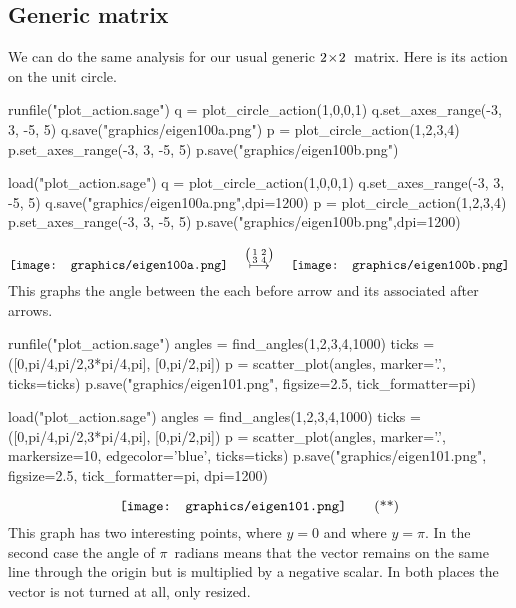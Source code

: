 \subsection{Generic matrix}
We can do the same analysis for our usual generic $2 \! \times \! 2$~matrix.
Here is its action on the unit circle.
\begin{sageoutput}[d,0,4;d,5,7]
runfile("plot_action.sage")
q = plot_circle_action(1,0,0,1) 
q.set_axes_range(-3, 3, -5, 5) 
q.save("graphics/eigen100a.png")
p = plot_circle_action(1,2,3,4) 
p.set_axes_range(-3, 3, -5, 5) 
p.save("graphics/eigen100b.png")
\end{sageoutput}
\begin{sagesilent}
load("plot_action.sage")
q = plot_circle_action(1,0,0,1) 
q.set_axes_range(-3, 3, -5, 5) 
q.save("graphics/eigen100a.png",dpi=1200)
p = plot_circle_action(1,2,3,4) 
p.set_axes_range(-3, 3, -5, 5) 
p.save("graphics/eigen100b.png",dpi=1200)
\end{sagesilent}
\begin{equation*}
  \vcenteredhbox{\texttt{[image: graphics/eigen100a.png]}}
  \quad\mapsunder{\big (\begin{smallmatrix} 1 &2 \\ 3 &4 \end{smallmatrix}\big )}\quad
  \vcenteredhbox{\texttt{[image: graphics/eigen100b.png]}}
\end{equation*}
This graphs the angle between the each before arrow and its associated after
arrows.
\begin{sageoutput}[d,0,1]
runfile("plot_action.sage")  
angles = find_angles(1,2,3,4,1000)
ticks = ([0,pi/4,pi/2,3*pi/4,pi], [0,pi/2,pi])
p = scatter_plot(angles, marker='.', ticks=ticks)
p.save("graphics/eigen101.png", figsize=2.5, tick_formatter=pi)
\end{sageoutput}
\begin{sagesilent}
load("plot_action.sage")  
angles = find_angles(1,2,3,4,1000)
ticks = ([0,pi/4,pi/2,3*pi/4,pi], [0,pi/2,pi])
p = scatter_plot(angles, marker='.', markersize=10, edgecolor='blue', ticks=ticks)
p.save("graphics/eigen101.png", figsize=2.5, tick_formatter=pi, dpi=1200)
\end{sagesilent}
\begin{equation*}
  \vcenteredhbox{\texttt{[image: graphics/eigen101.png]}}
  \tag{**}
\end{equation*}
This graph has two interesting points, where $y=0$ and where 
$y=\pi$.
In the second case
the angle of $\pi$~radians means that the vector remains on the
same line through the origin but is multiplied by a negative scalar.
In both places the vector is not turned at all, only resized.

